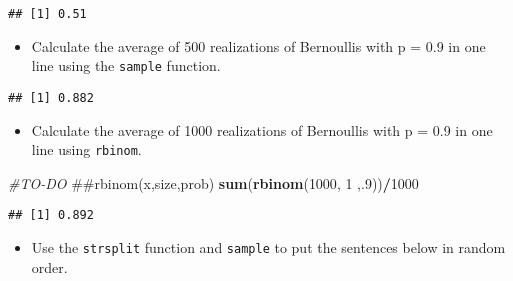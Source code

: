 \documentclass[]{article}
\newenvironment{Shaded}{\begin{snugshade}}{\end{snugshade}}
\newcommand{\KeywordTok}[1]{\textcolor[rgb]{0.13,0.29,0.53}{\textbf{#1}}}
\newcommand{\DataTypeTok}[1]{\textcolor[rgb]{0.13,0.29,0.53}{#1}}
\newcommand{\DecValTok}[1]{\textcolor[rgb]{0.00,0.00,0.81}{#1}}
\newcommand{\FloatTok}[1]{\textcolor[rgb]{0.00,0.00,0.81}{#1}}
\newcommand{\CommentTok}[1]{\textcolor[rgb]{0.56,0.35,0.01}{\textit{#1}}}
\newcommand{\OperatorTok}[1]{\textcolor[rgb]{0.81,0.36,0.00}{\textbf{#1}}}
\newcommand{\NormalTok}[1]{#1}
\providecommand{\tightlist}{%
  \setlength{\itemsep}{0pt}\setlength{\parskip}{0pt}}
\begin{document}
\begin{verbatim}
## [1] 0.51
\end{verbatim}

\begin{itemize}
\tightlist
\item
  Calculate the average of 500 realizations of Bernoullis with p = 0.9
  in one line using the \texttt{sample} function.
\end{itemize}

\begin{Shaded}
\end{Shaded}

\begin{verbatim}
## [1] 0.882
\end{verbatim}

\begin{itemize}
\tightlist
\item
  Calculate the average of 1000 realizations of Bernoullis with p = 0.9
  in one line using \texttt{rbinom}.
\end{itemize}

\begin{Shaded}
\begin{Highlighting}[]
\CommentTok{#TO-DO}
\NormalTok{##rbinom(x,size,prob)}
\KeywordTok{sum}\NormalTok{(}\KeywordTok{rbinom}\NormalTok{(}\DecValTok{1000}\NormalTok{, }\DecValTok{1}\NormalTok{ ,.}\DecValTok{9}\NormalTok{))}\OperatorTok{/}\DecValTok{1000}
\end{Highlighting}
\end{Shaded}

\begin{verbatim}
## [1] 0.892
\end{verbatim}

\begin{itemize}
\tightlist
\item
  Use the \texttt{strsplit} function and \texttt{sample} to put the
  sentences below in random order.
\end{itemize}
\end{document}
